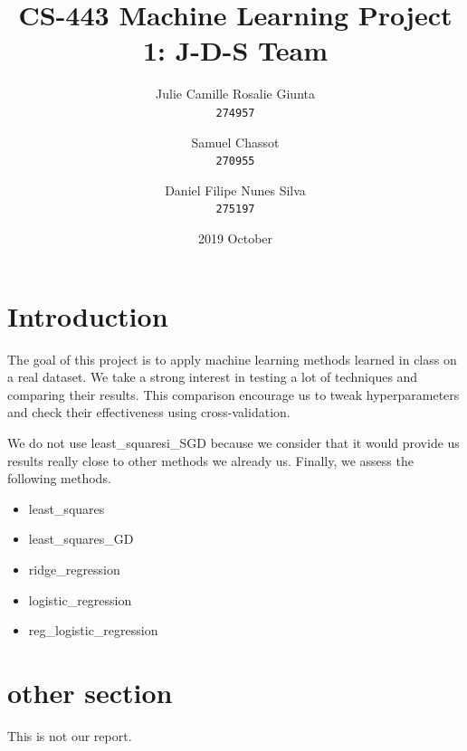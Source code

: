 \documentclass[11pt, a4paper, twoside]{article}
\begin{document}
\date{2019 October}
\title{CS-443 Machine Learning Project 1: J-D-S Team}
\author{
  Julie Camille Rosalie Giunta\\
  \texttt{274957}
  \and
  Samuel Chassot\\
  \texttt{270955}
  \and
  Daniel Filipe Nunes Silva\\
  \texttt{275197}
}

\maketitle
\clearpage

\section{Introduction}
The goal of this project is to apply machine learning
methods learned in class on a real dataset. We take a
strong interest in testing a lot of techniques and
comparing their results. This comparison encourage us to
tweak hyperparameters and check their effectiveness using
cross-validation.

We do not use least\_squaresi\_SGD because we consider
that it would provide us results really close to other
methods we already us. Finally, we assess the following
methods.

\begin{itemize}
  \item least\_squares
  \item least\_squares\_GD 
  \item ridge\_regression
  \item logistic\_regression
  \item reg\_logistic\_regression
\end{itemize}
 
\section{other section}
This is not our report.
\end{document}
